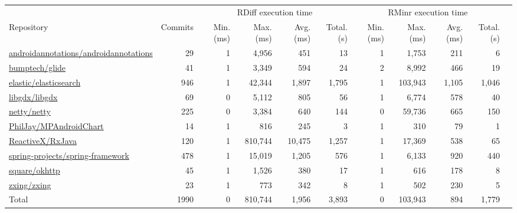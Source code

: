 \begin{tabular}{@{}lrrrrrrrrrr@{}}
\toprule
 &  & \multicolumn{4}{c}{RDiff execution time} & \multicolumn{4}{c}{RMinr execution time}\\
\cmidrule(lr){3-6} \cmidrule(lr){7-10}
Repository & Commits & Min. (ms) & Max. (ms) & Avg. (ms) & Total. (s) & Min. (ms) & Max. (ms) & Avg. (ms) & Total. (s)\\
\midrule
\url{androidannotations/androidannotations} & 29 & 1 & 4,956 & 451 & 13 & 1 & 1,753 & 211 & 6\\
\url{bumptech/glide} & 41 & 1 & 3,349 & 594 & 24 & 2 & 8,992 & 466 & 19\\
\url{elastic/elasticsearch} & 946 & 1 & 42,344 & 1,897 & 1,795 & 1 & 103,943 & 1,105 & 1,046\\
\url{libgdx/libgdx} & 69 & 0 & 5,112 & 805 & 56 & 1 & 6,774 & 578 & 40\\
\url{netty/netty} & 225 & 0 & 3,384 & 640 & 144 & 0 & 59,736 & 665 & 150\\
\url{PhilJay/MPAndroidChart} & 14 & 1 & 816 & 245 & 3 & 1 & 310 & 79 & 1\\
\url{ReactiveX/RxJava} & 120 & 1 & 810,744 & 10,475 & 1,257 & 1 & 17,369 & 538 & 65\\
\url{spring-projects/spring-framework} & 478 & 1 & 15,019 & 1,205 & 576 & 1 & 6,133 & 920 & 440\\
\url{square/okhttp} & 45 & 1 & 1,526 & 380 & 17 & 1 & 616 & 178 & 8\\
\url{zxing/zxing} & 23 & 1 & 773 & 342 & 8 & 1 & 502 & 230 & 5\\
\addlinespace
Total & 1990 & 0 & 810,744 & 1,956 & 3,893 & 0 & 103,943 & 894 & 1,779\\
\bottomrule
\end{tabular}





























































